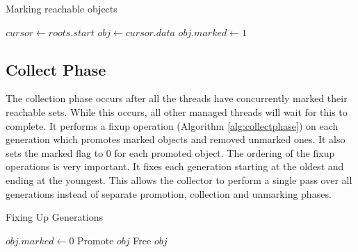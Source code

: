 \documentclass[../diss.tex]{subfiles}
\begin{document}
\begin{algorithm}
\caption{Marking reachable objects}
\label{alg:markphase}
\begin{algorithmic}


\State $cursor\gets roots.start$
\State $obj\gets cursor.data$ 
    \State $obj.marked\gets 1$
        \State{}
    \EndIf
\EndIf
\EndWhile

\EndFunction

\end{algorithmic}
\end{algorithm}

\subsection{Collect Phase}


The collection phase occurs after all the threads have concurrently marked their reachable sets. While this occurs, all other managed threads will wait for this to complete. It performs a fixup operation (Algorithm \ref{alg:collectphase}) on each generation which promotes marked objects and removed unmarked ones. It also sets the marked flag to 0 for each promoted object. The ordering of the fixup operations is very important. It fixes each generation starting at the oldest and ending at the youngest. This allows the collector to perform a single pass over all generations instead of separate promotion, collection and unmarking phases.

\begin{algorithm}
\caption{Fixing Up Generations}
\label{alg:collectphase}
\begin{algorithmic}


    
            \State $obj.marked\gets 0$
                \State Promote $obj$
            \EndIf
        \Else
            \State Free $obj$
        \EndIf
    
    \EndFor

\EndFunction

\end{algorithmic}
\end{algorithm}
\end{document}
